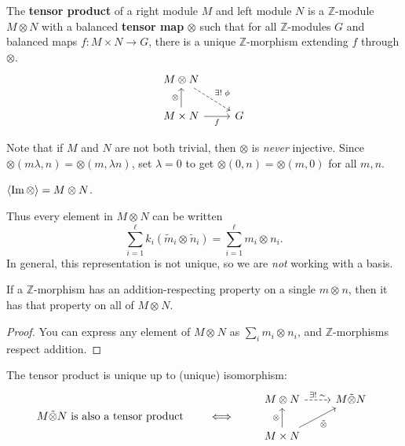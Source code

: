 \documentclass[twoside,10pt]{report}
\begin{document}
\begin{defn}[]
The \textbf{tensor product} of a right module $M$ and left module $N$ is a $\mathbb{Z}$-module $M \otimes N$ with a balanced \textbf{tensor map} $\otimes$ such that for all $\mathbb{Z}$-modules $G$ and balanced maps $f:M\times N\to G$, there is a unique $\mathbb{Z}$-morphism extending $f$ through $\otimes$.
\[
\begin{tikzcd}
	M\otimes N \arrow[dr,dashed,"\exists!\;\phi"] \\
	M\times N \uar{\otimes}\rar["f"'] & G
\end{tikzcd}
\]
\end{defn}

Note that if $M$ and $N$ are not both trivial, then $\otimes$ is \textit{never} injective. Since $\otimes(m \lambda,n) = \otimes(m,\lambda n)$, set $\lambda=0$ to get $\otimes(0,n)=\otimes(m,0)$ for all $m,n$.

\begin{prop}
$\langle \operatorname{Im} \otimes \rangle=M \otimes N$.
\end{prop}
Thus every element in $M \otimes_{}N$ can be written
\[
	\sum_{i=1}^{\ell} k_i (\tilde{m}_{i}\otimes_{}\tilde{n}_{i}) = \sum_{i=1}^{\ell} m_i \otimes_{}n_i.
\] 
In general, this representation is not unique, so we are \textit{not} working with a basis.

\begin{lem}
If a $\mathbb{Z}$-morphism has an addition-respecting property on a single $m \otimes_{}n$, then it has that property on all of $M \otimes_{}N$.
\end{lem}
\begin{proof}
	You can express any element of $M \otimes_{}N$ as $\sum_i m_i \otimes_{}n_i$, and $\mathbb{Z}$-morphisms respect addition.
\end{proof}

\pagebreak
\begin{thrm}[Uniqueness]
	The tensor product is unique up to (unique) isomorphism:
	\begin{equation*}
        \begin{aligned}[c]
		M \tilde{\otimes} N \text{ is also a tensor product}
        \end{aligned}
        \qquad\iff\qquad
        \begin{aligned}[c]
		\begin{tikzcd}
			M \otimes N \rar[dashed]{\exists!\;\sim} & M \tilde{\otimes} N \\
			M\times N \uar{\otimes}\arrow[ur,"\tilde{\otimes}"']
		\end{tikzcd}
        \end{aligned}
	\end{equation*}
\end{thrm}
\end{document}
